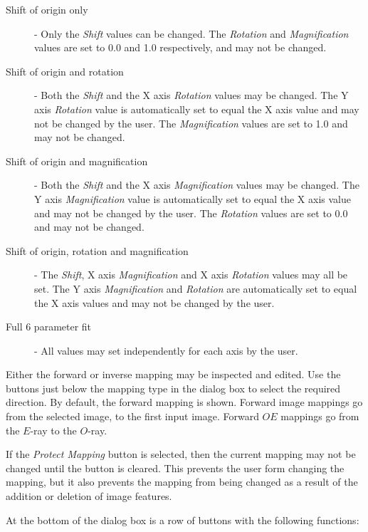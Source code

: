 \begin{description}

\item[Shift of origin only] - Only the {\em Shift} values can be changed.
The {\em Rotation} and {\em Magnification} values are set to 0.0 and 1.0
respectively, and may not be changed.

\item[Shift of origin and rotation] - Both the {\em Shift} and the X axis {\em
Rotation} values may be changed. The Y axis {\em Rotation} value is
automatically set to equal the X axis value and may not be changed by the
user. The {\em Magnification} values are set to 1.0 and may not be changed.

\item[Shift of origin and magnification] - Both the {\em Shift} and the X
axis {\em Magnification} values may be changed. The Y axis {\em
Magnification} value is automatically set to equal the X axis value and
may not be changed by the user. The {\em Rotation} values are set to 0.0 and 
may not be changed.

\item[Shift of origin, rotation and magnification] - The  {\em Shift},
X axis {\em Magnification} and X axis {\em Rotation} values may all be set.
The Y axis {\em Magnification} and {\em Rotation} are automatically set
to equal the X axis values and may not be changed by the user.

\item[Full 6 parameter fit] - All values may set independently for each
axis by the user.
\end{description}

Either the forward or inverse mapping may be inspected and edited. Use
the buttons just below the mapping type in the dialog box to select the
required direction. By default, the forward mapping is shown. Forward
image mappings go from the selected image, to the first input image.
Forward $OE$ mappings go from the $E$-ray to the $O$-ray.

If the {\em Protect Mapping} button is selected, then the current mapping
may not be changed until the button is cleared. This prevents the user
form changing the mapping, but it also prevents the mapping from being
changed as a result of the addition or deletion of image features.

At the bottom of the dialog box is a row of buttons with the following
functions:

